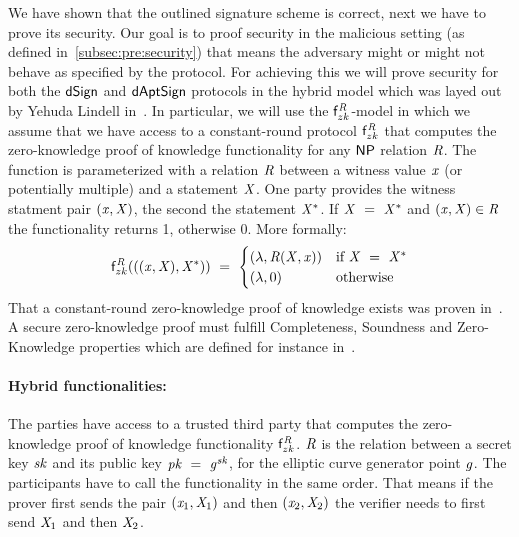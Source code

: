 We have shown that the outlined signature scheme is correct, next we have to prove its security.
Our goal is to proof security in the malicious setting (as defined in~\cref{subsec:pre:security}) that means the adversary might or might not behave as specified by the protocol.
For achieving this we will prove security for both the $\mathsf{dSign}$ and $\mathsf{dAptSign}$ protocols in the hybrid model which was layed out by Yehuda Lindell in~\cite{lindell2017simulate}.
In particular, we will use the $\mathsf{f}^{\mathit{R}}_{zk}$-model in which we assume that we have access to a constant-round protocol $\mathsf{f}^{\mathit{R}}_{zk}$ that computes the zero-knowledge proof of knowledge functionality for any $\mathsf{NP}$ relation $\mathit{R}$.
The function is parameterized with a relation $\mathit{R}$ between a witness value $\mathit{x}$ (or potentially multiple)  and a statement $\mathit{X}$.
One party provides the witness statment pair $(\mathit{x}, \mathit{X})$, the second the statement $\mathit{X}^*$.
If $\mathit{X} ~=~ \mathit{X}^*$ and $(\mathit{x}, \mathit{X}) \in \mathit{R}$ the functionality returns 1, otherwise 0.
More formally:
\[
    \mathsf{f}^{\mathit{R}}_{zk}(((\mathit{x}, \mathit{X}), \mathit{X}^*)) ~=~
    \begin{cases}
        (\lambda, \mathit{R}(\mathit{X}, \mathit{x})) & \text{if } \mathit{X} ~=~ \mathit{X}^* \\
        (\lambda, 0) &\text{otherwise}
    \end{cases}
\]
That a constant-round zero-knowledge proof of knowledge exists was proven in~\cite{lindell2013note}.
A secure zero-knowledge proof must fulfill Completeness, Soundness and Zero-Knowledge properties which are defined for instance in~\cite{groth2010short}.

\paragraph{Hybrid functionalities:} The parties have access to a trusted third party that computes the zero-knowledge proof of knowledge functionality $\mathsf{f}^{\mathit{R}}_{zk}$. $\mathit{R}$ is the relation between a secret key $\mathit{sk}$ and its public key $\mathit{pk} ~=~ \mathit{g}^{\mathit{sk}}$, for the elliptic curve generator point $\mathit{g}$.
The participants have to call the functionality in the same order.
That means if the prover first sends the pair $(\mathit{x}_1, \mathit{X}_1)$ and then $(\mathit{x}_2, \mathit{X}_2)$ the verifier needs to first send $\mathit{X}_1$ and then $\mathit{X}_2$.

